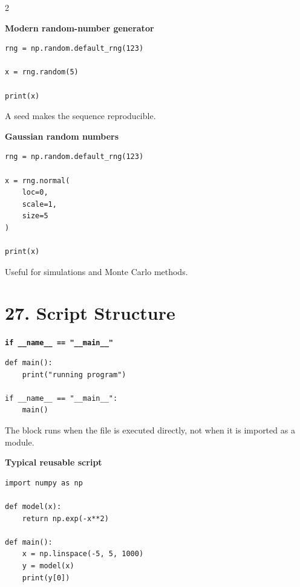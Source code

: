 \documentclass[10pt,a4paper]{article}
\begin{document}
\begin{multicols}{2}
\begin{card}
\textbf{Modern random-number generator}

\begin{lstlisting}[style=pythonstyle]
rng = np.random.default_rng(123)

x = rng.random(5)

print(x)
\end{lstlisting}

A seed makes the sequence reproducible.
\end{card}

\begin{card}
\textbf{Gaussian random numbers}

\begin{lstlisting}[style=pythonstyle]
rng = np.random.default_rng(123)

x = rng.normal(
    loc=0,
    scale=1,
    size=5
)

print(x)
\end{lstlisting}

Useful for simulations and Monte Carlo methods.
\end{card}

\section*{27. Script Structure}

\begin{card}
\textbf{\texttt{if \_\_name\_\_ == "\_\_main\_\_"}}

\begin{lstlisting}[style=pythonstyle]
def main():
    print("running program")

if __name__ == "__main__":
    main()
\end{lstlisting}

The block runs when the file is executed directly,
not when it is imported as a module.
\end{card}

\begin{card}
\textbf{Typical reusable script}

\begin{lstlisting}[style=pythonstyle]
import numpy as np

def model(x):
    return np.exp(-x**2)

def main():
    x = np.linspace(-5, 5, 1000)
    y = model(x)
    print(y[0])


\end{lstlisting}
\end{card}
\end{multicols}
\end{document}
